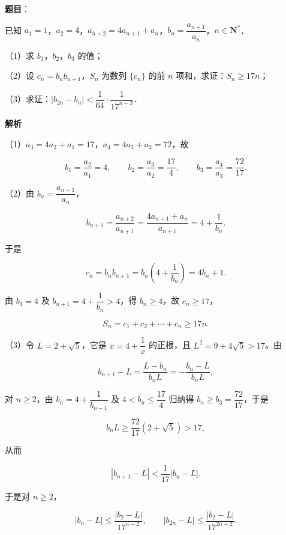 \begin{answer}

\textbf{题目}：

已知 $a_1=1$，$a_2=4$，$a_{n+2}=4a_{n+1}+a_n$，$b_n=\dfrac{a_{n+1}}{a_n}$，$n\in\mathbf N^*$．

（1）求 $b_1$，$b_2$，$b_3$ 的值；

（2）设 $c_n=b_nb_{n+1}$，$S_n$ 为数列 $\{c_n\}$ 的前 $n$ 项和，求证：$S_n\geqslant17n$；

（3）求证：$|b_{2n}-b_n|<\dfrac1{64}\cdot\dfrac1{17^{n-2}}$．

\textbf{解析}

（1）$a_3=4a_2+a_1=17$，$a_4=4a_3+a_2=72$，故

\nopagebreak[4]
\[b_1=\frac{a_2}{a_1}=4,\qquad b_2=\frac{a_3}{a_2}=\frac{17}4,\qquad b_3=\frac{a_4}{a_3}=\frac{72}{17}.\]

（2）由 $b_n=\dfrac{a_{n+1}}{a_n}$，

\nopagebreak[4]
\[b_{n+1}=\frac{a_{n+2}}{a_{n+1}}=\frac{4a_{n+1}+a_n}{a_{n+1}}=4+\frac1{b_n}.\]

于是

\nopagebreak[4]
\[c_n=b_nb_{n+1}=b_n\left(4+\frac1{b_n}\right)=4b_n+1.\]

由 $b_1=4$ 及 $b_{n+1}=4+\dfrac1{b_n}>4$，得 $b_n\geqslant4$，故 $c_n\geqslant17$，

\nopagebreak[4]
\[S_n=c_1+c_2+\cdots+c_n\geqslant17n.\]

（3）令 $L=2+\sqrt5$，它是 $x=4+\dfrac1x$ 的正根，且 $L^2=9+4\sqrt5>17$。由

\nopagebreak[4]
\[b_{n+1}-L=\frac{L-b_n}{b_nL}=-\frac{b_n-L}{b_nL},\]

对 $n\geqslant2$，由 $b_n=4+\dfrac1{b_{n-1}}$ 及 $4<b_n\leqslant\dfrac{17}4$ 归纳得 $b_n\geqslant b_3=\dfrac{72}{17}$，于是

\nopagebreak[4]
\[b_nL\geqslant\frac{72}{17}(2+\sqrt5)>17,\]

从而

\nopagebreak[4]
\[|b_{n+1}-L|<\frac1{17}|b_n-L|.\]

于是对 $n\geqslant2$，

\nopagebreak[4]
\[|b_n-L|\leqslant\frac{|b_2-L|}{17^{n-2}},\qquad
|b_{2n}-L|\leqslant\frac{|b_2-L|}{17^{2n-2}}.\]


\end{answer}
